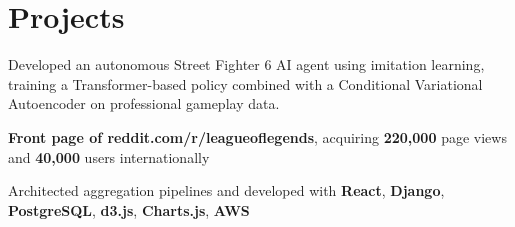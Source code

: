 \documentclass[]{peter_resume}
\begin{document}
\begin{minipage}{\textwidth}

\section{Projects}

 
\begin{tightemize}
    \item Developed an autonomous Street Fighter 6 AI agent using imitation learning, training a Transformer-based policy combined with a Conditional Variational Autoencoder on professional gameplay data.
\end{tightemize} 
\sectionsep

 
\begin{tightemize}
    \item \textbf{Front page of reddit.com/r/leagueoflegends}, acquiring \textbf{220,000} page views and \textbf{40,000} users internationally %
    \item Architected aggregation pipelines and developed with \textbf{React}, \textbf{Django}, \textbf{PostgreSQL}, \textbf{d3.js}, \textbf{Charts.js}, \textbf{AWS}
\end{tightemize} 
\sectionsep


\end{minipage}
\end{document}
